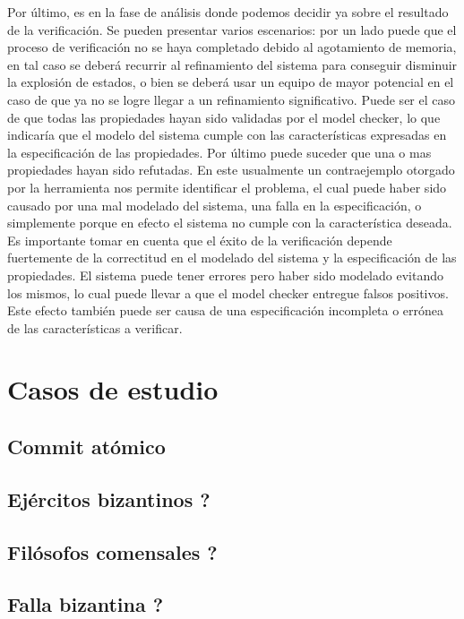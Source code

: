 \documentclass[titlepage, 12pt]{book}
\begin{document}
Por último, es en la fase de análisis donde podemos decidir ya sobre el resultado de la verificación. Se pueden presentar varios escenarios: por un lado puede que el proceso de verificación no se haya completado debido al agotamiento de memoria, en tal caso se deberá recurrir al refinamiento del sistema para conseguir disminuir la explosión de estados, o bien se deberá usar un equipo de mayor potencial en el caso de que ya no se logre llegar a un refinamiento significativo. Puede ser el caso de que todas las propiedades hayan sido validadas por el model checker, lo que indicaría que el modelo del sistema cumple con las características expresadas en la especificación de las propiedades. Por último puede suceder que una o mas propiedades hayan sido refutadas. En este usualmente un contraejemplo otorgado por la herramienta nos permite identificar el problema, el cual puede haber sido causado por una mal modelado del sistema, una falla en la especificación, o simplemente porque en efecto el sistema no cumple con la característica deseada.\\

Es importante tomar en cuenta que el éxito de la verificación depende fuertemente de la correctitud en el modelado del sistema y la especificación de las propiedades. El sistema puede tener errores pero haber sido modelado evitando los mismos, lo cual puede llevar a que el model checker entregue falsos positivos. Este efecto también puede ser causa de una especificación incompleta o errónea de las características a verificar.\\









\chapter{Casos de estudio}
			\section{Commit at\'omico}
			\section{Ej\'ercitos bizantinos ?}
			\section{Fil\'osofos comensales ?}
			\section{Falla bizantina ?}
\end{document}
